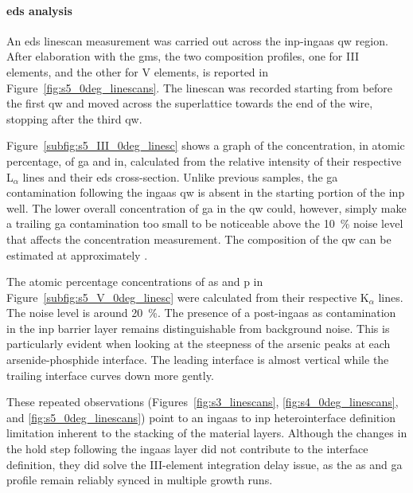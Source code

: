 \paragraph{\acs{eds} analysis} An \acs{eds} linescan measurement was carried out across the \acs{inp}-\acs{ingaas} \acl{qw} region. After elaboration with the \acf{gms}, the two composition profiles, one for III elements, and the other for V elements, is reported in Figure~\ref{fig:s5_0deg_linescans}. The linescan was recorded starting from before the first \acl{qw} and moved across the superlattice towards the end of the wire, stopping after the third \acl{qw}.

Figure~\ref{subfig:s5_III_0deg_linesc} shows a graph of the concentration, in atomic percentage, of \acl{ga} and \acl{in}, calculated from the relative intensity of their respective L\(_\alpha\) lines and their \acs{eds} cross-section. Unlike previous samples, the \acl{ga} contamination following the \acs{ingaas} \acl{qw} is absent in the starting portion of the \acs{inp} well. The lower overall concentration of \acl{ga} in the \acl{qw} could, however, simply make a trailing \acl{ga} contamination too small to be noticeable above the \qty{10}{\%} noise level that affects the concentration measurement. The composition of the \acl{qw} can be estimated at approximately .

The atomic percentage concentrations of \acl{as} and \acl{p} in Figure~\ref{subfig:s5_V_0deg_linesc} were calculated from their respective K\(_\alpha\) lines. The noise level is around \qty{20}{\%}. The presence of a post-\acs{ingaas} \acl{as} contamination in the \acs{inp} barrier layer remains distinguishable from background noise. This is particularly evident when looking at the steepness of the arsenic peaks at each arsenide-phosphide interface. The leading interface is almost vertical while the trailing interface curves down more gently.

These repeated observations (Figures~\ref{fig:s3_linescans}, \ref{fig:s4_0deg_linescans}, and \ref{fig:s5_0deg_linescans}) point to an \acs{ingaas} to \acs{inp} heterointerface definition limitation inherent to the stacking of the material layers. Although the changes in the hold step following the \acs{ingaas} layer did not contribute to the interface definition, they did solve the III-element integration delay issue, as the \acl{as} and \acs{ga} profile remain reliably synced in multiple growth runs.
\par

